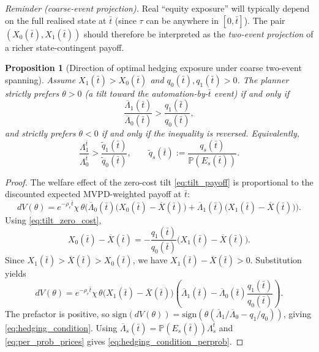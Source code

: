 \documentclass{article}
\newtheorem{proposition}{Proposition}
\begin{document}
\emph{Reminder (coarse-event projection).} Real ``equity exposure'' will typically depend on the full realised state at $\bar t$ (since $\tau$ can be anywhere in $[0,\bar t]$). The pair $(X_0(\bar t),X_1(\bar t))$ should therefore be interpreted as the \emph{two-event projection} of a richer state-contingent payoff.

\begin{proposition}[Direction of optimal hedging exposure under coarse two-event spanning]
\label{prop:hedging_direction}
Assume $X_1(\bar t)>X_0(\bar t)$ and $q_0(\bar t),q_1(\bar t)>0$. The planner strictly prefers $\theta>0$ (a tilt toward the automation-by-$\bar t$ event) if and only if
\begin{equation}
\label{eq:hedging_condition}
\frac{\overline\Lambda_1(\bar t)}{\overline\Lambda_0(\bar t)}>\frac{q_1(\bar t)}{q_0(\bar t)},
\end{equation}
and strictly prefers $\theta<0$ if and only if the inequality is reversed. Equivalently,
\begin{equation}
\label{eq:hedging_condition_perprob}
\frac{\Lambda^{\bar t}_1}{\Lambda^{\bar t}_0}>\frac{\widetilde q_1(\bar t)}{\widetilde q_0(\bar t)},
\qquad
\widetilde q_s(\bar t):=\frac{q_s(\bar t)}{\mathbb P(E_s(\bar t))}.
\end{equation}
\end{proposition}

\begin{proof}
The welfare effect of the zero-cost tilt \eqref{eq:tilt_payoff} is proportional to the discounted expected MVPD-weighted payoff at $\bar t$:
\[
dV(\theta)
=
e^{-\rho_e \bar t}\chi\,\theta\Big(
\overline\Lambda_0(\bar t)\big(X_0(\bar t)-\overline X(\bar t)\big)
+
\overline\Lambda_1(\bar t)\big(X_1(\bar t)-\overline X(\bar t)\big)
\Big).
\]
Using \eqref{eq:tilt_zero_cost},
\[
X_0(\bar t)-\overline X(\bar t)
=
-\frac{q_1(\bar t)}{q_0(\bar t)}\big(X_1(\bar t)-\overline X(\bar t)\big).
\]
Since $X_1(\bar t)>\overline X(\bar t)>X_0(\bar t)$, we have $X_1(\bar t)-\overline X(\bar t)>0$. Substitution yields
\[
dV(\theta)
=
e^{-\rho_e \bar t}\chi\,\theta\big(X_1(\bar t)-\overline X(\bar t)\big)
\left(
\overline\Lambda_1(\bar t)-\overline\Lambda_0(\bar t)\frac{q_1(\bar t)}{q_0(\bar t)}
\right).
\]
The prefactor is positive, so $\mathrm{sign}(dV(\theta))=\mathrm{sign}\!\left(\theta\left(\overline\Lambda_1/\overline\Lambda_0-q_1/q_0\right)\right)$, giving \eqref{eq:hedging_condition}. Using $\overline\Lambda_s(\bar t)=\mathbb P(E_s(\bar t))\Lambda^{\bar t}_s$ and \eqref{eq:per_prob_prices} gives \eqref{eq:hedging_condition_perprob}.
\end{proof}
\end{document}
